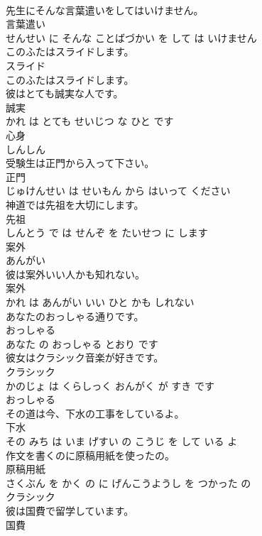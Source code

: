 \documentclass[8pt]{extreport}
\begin{document}
\begin{CJK}{UTF8}{min}
\\	先生にそんな言葉遣いをしてはいけません。	
\\	言葉遣い 
\\	せんせい に そんな ことばづかい を して は いけません			
\\	このふたはスライドします。	
\\	スライド 
\\	このふたはスライドします。			
\\	彼はとても誠実な人です。	
\\	誠実 
\\	かれ は とても せいじつ な ひと です			
\\	心身	
\\	しんしん			
\\	受験生は正門から入って下さい。	
\\	正門 
\\	じゅけんせい は せいもん から はいって ください			
\\	神道では先祖を大切にします。	
\\	先祖 
\\	しんとう で は せんぞ を たいせつ に します			
\\	案外	
\\	あんがい		
\\	彼は案外いい人かも知れない。	
\\	案外 
\\	かれ は あんがい いい ひと かも しれない			
\\	あなたのおっしゃる通りです。	
\\	おっしゃる 
\\	あなた の おっしゃる とおり です			
\\	彼女はクラシック音楽が好きです。	
\\	クラシック 
\\	かのじょ は くらしっく おんがく が すき です			
\\	おっしゃる	
\\	その道は今、下水の工事をしているよ。	
\\	下水 
\\	その みち は いま げすい の こうじ を して いる よ			
\\	作文を書くのに原稿用紙を使ったの。	
\\	原稿用紙 
\\	さくぶん を かく の に げんこうようし を つかった の			
\\	クラシック	
\\	彼は国費で留学しています。	
\\	国費 

\end{CJK}
\end{document}
